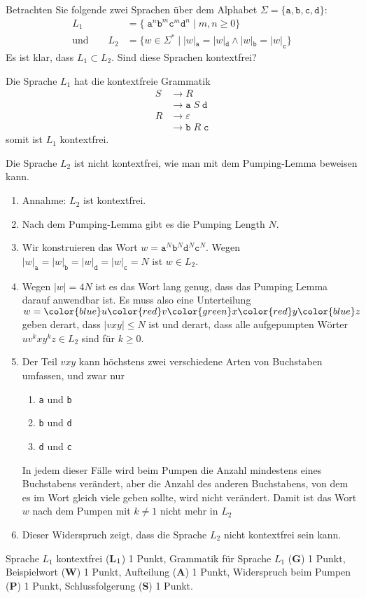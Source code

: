 Betrachten Sie folgende zwei Sprachen über dem Alphabet $\Sigma = \{
\texttt{a},
\texttt{b},
\texttt{c},
\texttt{d}\}$:
\begin{align*}
L_1&=\{\;\texttt{a}^n\texttt{b}^m\texttt{c}^m\texttt{d}^n
\;|\;
m,n\ge 0\}
\\
\text{und}
\qquad
L_2&=\{w\in\Sigma^*
\;|\;
|w|_{\texttt{a}} = |w|_{\texttt{d}}
\wedge
|w|_{\texttt{b}} = |w|_{\texttt{c}}
\}
\end{align*}
Es ist klar, dass $L_1\subset L_2$.
Sind diese Sprachen kontextfrei?


\begin{loesung}
Die Sprache $L_1$ hat die kontextfreie Grammatik
\begin{align*}
S&\to R                             \\
 &\to \texttt{a}\;S\;\texttt{d}     \\
R&\to\varepsilon                    \\
 &\to\texttt{b}\;R\;\texttt{c}
\end{align*}
somit ist $L_1$ kontextfrei.

Die Sprache $L_2$ ist nicht kontextfrei, wie man mit dem Pumping-Lemma
beweisen kann.
\begin{enumerate}
\item
Annahme: $L_2$ ist kontextfrei.
\item
Nach dem Pumping-Lemma gibt es die Pumping Length $N$.
\item
Wir konstruieren das Wort
$w=
\texttt{a}^N
\texttt{b}^N
\texttt{d}^N
\texttt{c}^N$.
Wegen $
|w|_{\texttt{a}}
=
|w|_{\texttt{b}}
=
|w|_{\texttt{d}}
=
|w|_{\texttt{c}}
=N$ ist $w\in L_2$.
\item
Wegen $|w|=4N$ ist es das Wort lang genug, dass das Pumping Lemma darauf
anwendbar ist.
Es muss also eine Unterteilung $w=
{\color{blue}u}
{\color{red}v}
{\color{green}x}
{\color{red}y}
{\color{blue}z}
$ geben derart, dass $|vxy|\le N$ ist und derart, dass alle aufgepumpten
Wörter $uv^kxy^kz\in L_2$ sind für $k\ge 0$.
\item
Der Teil $vxy$ kann höchstens zwei verschiedene Arten von Buchstaben umfassen,
und zwar nur
\begin{enumerate}
\item
\texttt{a} und \texttt{b}
\item
\texttt{b} und \texttt{d}
\item
\texttt{d} und \texttt{c}
\end{enumerate}
In jedem dieser Fälle wird beim Pumpen die Anzahl mindestens eines Buchstabens
verändert,
aber die Anzahl des anderen Buchstabens, von dem es im Wort gleich
viele geben sollte, wird nicht verändert.
Damit ist das Wort $w$ nach dem Pumpen mit $k\ne 1$ nicht mehr in $L_2$
\item
Dieser Widerspruch zeigt, dass die Sprache $L_2$ nicht kontextfrei sein kann.
\qedhere
\end{enumerate}
\end{loesung}

\begin{bewertung}
Sprache $L_1$ kontextfrei ({\bf L}$\mathstrut_1$) 1 Punkt,
Grammatik für Sprache $L_1$ ({\bf G}) 1 Punkt,
Beispielwort ({\bf W}) 1 Punkt,
Aufteilung ({\bf A}) 1 Punkt,
Widerspruch beim Pumpen ({\bf P}) 1 Punkt,
Schlussfolgerung ({\bf S}) 1 Punkt.
\end{bewertung}


